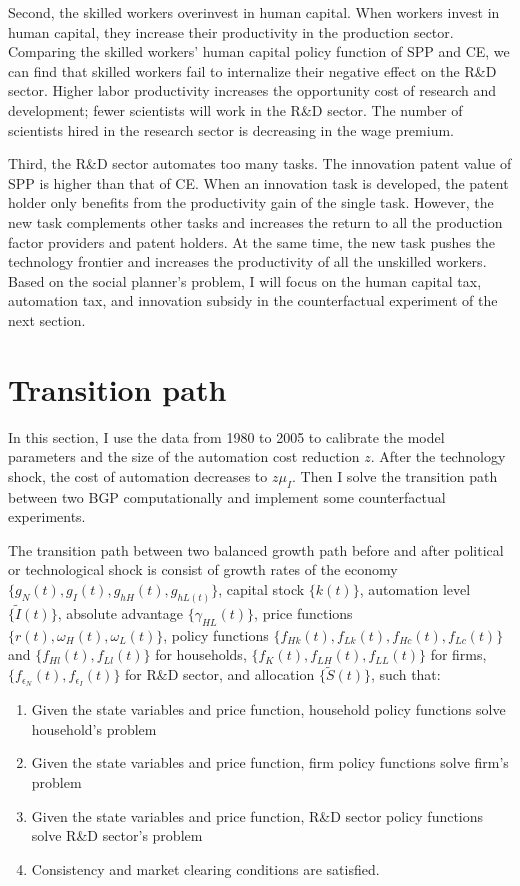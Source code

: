 \documentclass[12pt]{article}
\begin{document}
Second, the skilled workers overinvest in human capital. When workers invest in human capital, they increase their productivity in the production sector. Comparing the skilled workers' human capital policy function of SPP and CE, we can find that skilled workers fail to internalize their negative effect on the R\&D sector. Higher labor productivity increases the opportunity cost of research and development; fewer scientists will work in the R\&D sector. The number of scientists hired in the research sector is decreasing in the wage premium.

Third, the R\&D sector automates too many tasks. The innovation patent value of SPP is higher than that of CE. When an innovation task is developed, the patent holder only benefits from the productivity gain of the single task. However, the new task complements other tasks and increases the return to all the production factor providers and patent holders. At the same time, the new task pushes the technology frontier and increases the productivity of all the unskilled workers. Based on the social planner's problem, I will focus on the human capital tax, automation tax, and innovation subsidy in the counterfactual experiment of the next section.

\section{Transition path}
In this section, I use the data from 1980 to 2005 to calibrate the model parameters and the size of the automation cost reduction $z$. After the technology shock, the cost of automation decreases to $z\mu_I$. Then I solve the transition path between two BGP computationally and implement some counterfactual experiments. 

The transition path between two balanced growth path before and after political or technological shock is consist of growth rates of the economy $\{g_N(t), g_I(t), g_{hH}(t),g_{hL(t)}\}$, capital stock $\{k(t)\}$, automation level $\{\tilde{I}(t)\}$, absolute advantage $\{\gamma_{HL}(t)\}$, price functions $\{r(t), \omega_H(t), \omega_L(t)\}$, policy functions $\{f_{Hk}(t), f_{Lk}(t), f_{Hc}(t), f_{Lc}(t)\}$ and $\{f_{Hl}(t), f_{Ll}(t)\}$ for households, $\{f_{K}(t), f_{LH}(t), f_{LL}(t)\}$ for firms, $\{f_{\epsilon_N}(t), f_{\epsilon_I}(t)\}$ for R\&D sector, and allocation $\{\tilde{S}(t)\}$, such that: 
\begin{enumerate}
\item Given the state variables and price function, household policy functions solve household's problem
\item Given the state variables and price function, firm policy functions solve firm's problem
\item Given the state variables and price function, R\&D sector policy functions solve  R\&D sector's problem
\item Consistency and market clearing conditions are satisfied. 
\end{enumerate}
\end{document}
